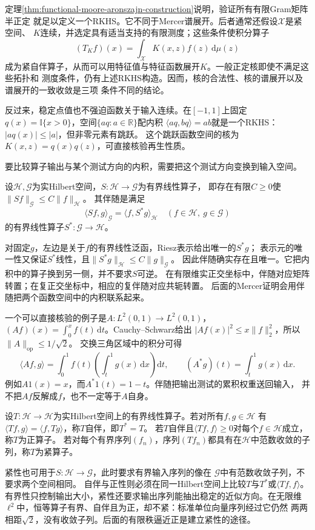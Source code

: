 定理\ref{thm:functional-moore-aronszajn-construction}说明，验证所有有限Gram矩阵半正定
就足以定义一个RKHS。它不同于Mercer谱展开。后者通常还假设$\mathcal{X}$是紧空间、
$K$连续，并选定具有适当支持的有限测度；这些条件使积分算子
\[
  (T_Kf)(x)
  =
  \int_{\mathcal{X}}K(x,z)f(z)\,\mathrm{d}\mu(z)
\]
成为紧自伴算子，从而可以用特征值与特征函数展开$K$。一般正定核即使不满足这些拓扑和
测度条件，仍有上述RKHS构造。因而，核的合法性、核的谱展开以及谱展开的一致收敛是三项
条件不同的结论。

反过来，稳定点值也不强迫函数关于输入连续。在$[-1,1]$上固定
$q(x)=\mathbb I\{x>0\}$，空间$\{a q:a\in\mathbb R\}$配内积
$\langle aq,bq\rangle=ab$就是一个RKHS：$|aq(x)|\leq|a|$，但非零元素有跳跃。
这个跳跃函数空间的核为$K(x,z)=q(x)q(z)$，可直接核验再生性质。

要比较算子输出与某个测试方向的内积，需要把这个测试方向变换到输入空间。
\begin{definition}[Hilbert空间之间的伴随算子]
\label{def:functional-adjoint}
设$\mathcal H,\mathcal G$为实Hilbert空间，$S:\mathcal H\to\mathcal G$为有界线性算子，
即存在有限$C\geq0$使$\lVert Sf\rVert_{\mathcal G}\leq C\lVert f\rVert_{\mathcal H}$。
其伴随是满足
\[
 \langle Sf,g\rangle_{\mathcal G}
 =\langle f,S^*g\rangle_{\mathcal H}
 \quad(f\in\mathcal H,\ g\in\mathcal G)
\]
的有界线性算子$S^*:\mathcal G\to\mathcal H$。
\end{definition}
对固定$g$，左边是关于$f$的有界线性泛函，Riesz表示给出唯一的$S^*g$；
表示元的唯一性又保证$S^*$线性，且$\lVert S^*g\rVert_{\mathcal H}\leq C\lVert g\rVert_{\mathcal G}$。
因此伴随确实存在且唯一。它把内积中的算子换到另一侧，并不要求$S$可逆。
在有限维实正交坐标中，伴随对应矩阵转置；在复正交坐标中，相应的复伴随对应共轭转置。
后面的Mercer证明会用伴随把两个函数空间中的内积联系起来。

一个可以直接核验的例子是$A:L^2(0,1)\to L^2(0,1)$，
$(Af)(x)=\int_0^x f(t)\,\mathrm dt$。Cauchy--Schwarz给出
$|Af(x)|^2\leq x\lVert f\rVert_2^2$，所以$\lVert A\rVert_{\mathrm{op}}\leq1/\sqrt2$。
交换三角区域中的积分可得
\[
 \langle Af,g\rangle
 =\int_0^1 f(t)\left(\int_t^1g(x)\,\mathrm dx\right)\mathrm dt,\qquad
 (A^*g)(t)=\int_t^1g(x)\,\mathrm dx.
\]
例如$A1(x)=x$，而$A^*1(t)=1-t$。伴随把输出测试的累积权重送回输入，
并不把$Af$反解成$f$，也不一定等于$A$自身。

\begin{definition}[自伴、正与紧算子]
\label{def:functional-operator-properties}
设$T:\mathcal H\to\mathcal H$为实Hilbert空间上的有界线性算子。若对所有$f,g\in\mathcal H$
有$\langle Tf,g\rangle=\langle f,Tg\rangle$，称$T$自伴，即$T^*=T$。
若$T$自伴且$\langle Tf,f\rangle\geq0$对每个$f\in\mathcal H$成立，称$T$为正算子。
若对每个有界序列$(f_n)$，序列$(Tf_n)$都具有在$\mathcal H$中范数收敛的子列，称$T$为紧算子。
\end{definition}
紧性也可用于$S:\mathcal H\to\mathcal G$，此时要求有界输入序列的像在
$\mathcal G$中有范数收敛子列，不要求两个空间相同。
自伴与正性则必须在同一Hilbert空间上比较$T$与$T^*$或$\langle Tf,f\rangle$。
有界性只控制输出大小，紧性还要求输出序列能抽出稳定的近似方向。在无限维
$\ell^2$中，恒等算子有界、自伴且为正，却不紧：标准单位向量序列经过它仍然
两两相距$\sqrt2$，没有收敛子列。后面的有限秩逼近正是建立紧性的途径。

